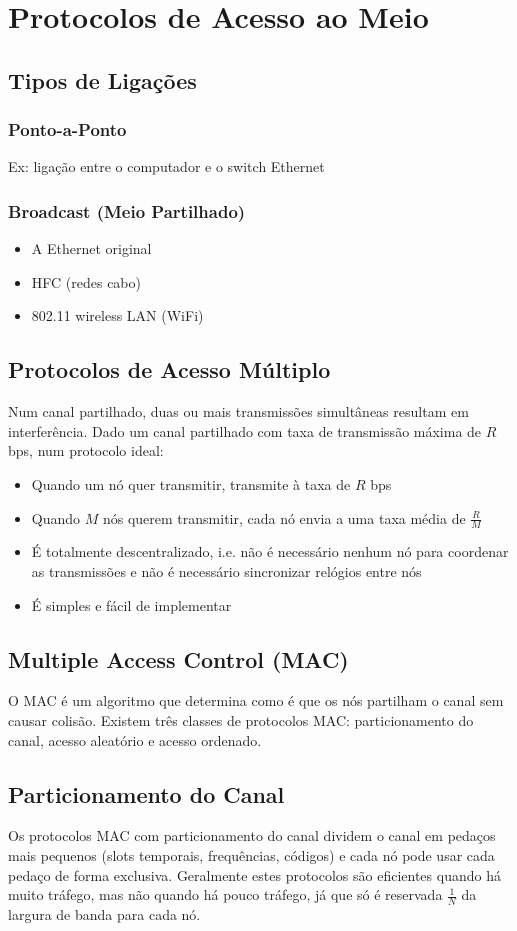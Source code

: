 \documentclass[10pt,a4paper]{report}
\begin{document}
\section{Protocolos de Acesso ao Meio}
\subsection{Tipos de Ligações}
\subsubsection{Ponto-a-Ponto}
Ex: ligação entre o computador e o switch Ethernet
\subsubsection{Broadcast (Meio Partilhado)}
\begin{itemize}
\item A Ethernet original
\item HFC (redes cabo)
\item 802.11 wireless LAN (WiFi)
\end{itemize}
\subsection{Protocolos de Acesso Múltiplo}
Num canal partilhado, duas ou mais transmissões simultâneas resultam em interferência. Dado um canal partilhado com taxa de transmissão máxima de $R$ bps, num protocolo ideal:
\begin{itemize}
\item Quando um nó quer transmitir, transmite à taxa de $R$ bps
\item Quando $M$ nós querem transmitir, cada nó envia a uma taxa média de $\frac{R}{M}$
\item É totalmente descentralizado, i.e. não é necessário nenhum nó para coordenar as transmissões e não é necessário sincronizar relógios entre nós
\item É simples e fácil de implementar
\end{itemize}
\subsection{Multiple Access Control (MAC)}
O MAC é um algoritmo que determina como é que os nós partilham o canal sem causar colisão. Existem três classes de protocolos MAC: particionamento do canal, acesso aleatório e acesso ordenado.
\subsection{Particionamento do Canal}
Os protocolos MAC com particionamento do canal dividem o canal em pedaços mais pequenos (slots temporais, frequências, códigos) e cada nó pode usar cada pedaço de forma exclusiva. Geralmente estes protocolos são eficientes quando há muito tráfego, mas não quando há pouco tráfego, já que só é reservada $\frac{1}{N}$ da largura de banda para cada nó.
\end{document}

